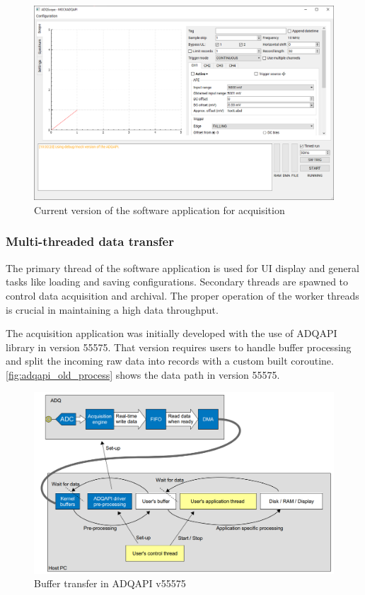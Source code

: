 \begin{figure}[H]
  \centering
  \includegraphics[width=\linewidth]{media/qtadqscope_v3.png}
  \caption{Current version of the software application for acquisition}
  \label{fig:qtadqscope_v3} 
\end{figure}
\subsubsection{Multi-threaded data transfer}

The primary thread of the software application
is used for UI display and general tasks like 
loading and saving configurations. Secondary threads
are spawned to control data acquisition and archival.
The proper operation of the worker threads
is crucial in maintaining a high data throughput.


The acquisition application was initially developed with 
the use of ADQAPI library in version 55575. That version
requires users to handle buffer processing and split the incoming
raw data into records with a custom built coroutine. \autoref{fig:adqapi_old_process}
shows the data path in version 55575. 

\begin{figure}[H]
  \centering
  \includegraphics[width=\linewidth]{media/adqapi_old_process.png}
  \caption{Buffer transfer in ADQAPI v55575\cite{adq14_manual}}
  \label{fig:adqapi_old_process} 
\end{figure}

